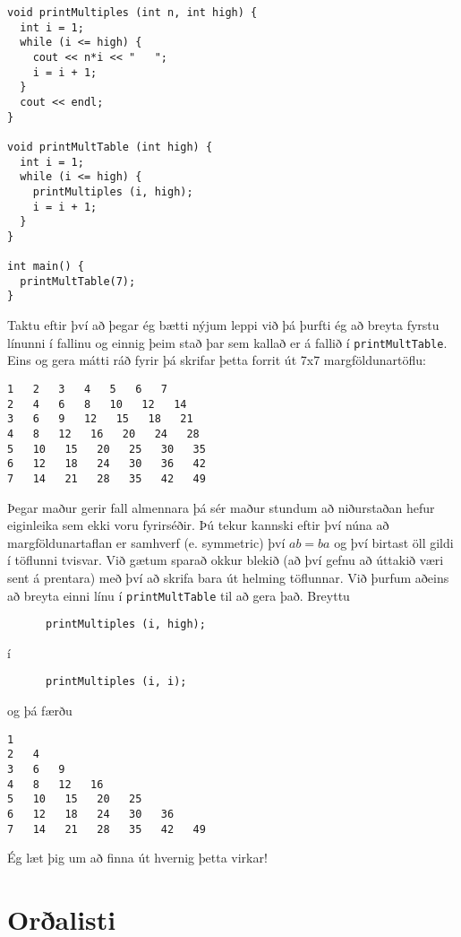 \begin{verbatim}
void printMultiples (int n, int high) {
  int i = 1;
  while (i <= high) {
    cout << n*i << "   ";
    i = i + 1;
  }    
  cout << endl;
}

void printMultTable (int high) {
  int i = 1;
  while (i <= high) {
    printMultiples (i, high);
    i = i + 1;
  }
}

int main() {
  printMultTable(7);
}

\end{verbatim}
%
Taktu eftir því að þegar ég bætti nýjum leppi við þá þurfti ég að breyta fyrstu línunni í fallinu og einnig þeim stað þar sem kallað er á fallið í {\tt printMultTable}.
Eins og gera mátti ráð fyrir þá skrifar þetta forrit út 7x7 margföldunartöflu:

\begin{verbatim}
1   2   3   4   5   6   7   
2   4   6   8   10   12   14   
3   6   9   12   15   18   21   
4   8   12   16   20   24   28   
5   10   15   20   25   30   35   
6   12   18   24   30   36   42   
7   14   21   28   35   42   49
\end{verbatim}
%
Þegar maður gerir fall almennara þá sér maður stundum að niðurstaðan hefur eiginleika sem ekki voru fyrirséðir.
Þú tekur kannski eftir því núna að margföldunartaflan er samhverf (e. symmetric) því $ab = ba$ og því birtast öll gildi í töflunni tvisvar.
Við gætum sparað okkur blekið (að því gefnu að úttakið væri sent á prentara) með því að skrifa bara út helming töflunnar.
Við þurfum aðeins að breyta einni línu í {\tt printMultTable} til að gera það.
Breyttu

\begin{verbatim}
      printMultiples (i, high);
\end{verbatim}
%
í

\begin{verbatim}
      printMultiples (i, i);
\end{verbatim}
%
og þá færðu

\begin{verbatim}
1   
2   4   
3   6   9   
4   8   12   16   
5   10   15   20   25   
6   12   18   24   30   36   
7   14   21   28   35   42   49  
\end{verbatim}
%
Ég læt þig um að finna út hvernig þetta virkar!

\section{Orðalisti}

